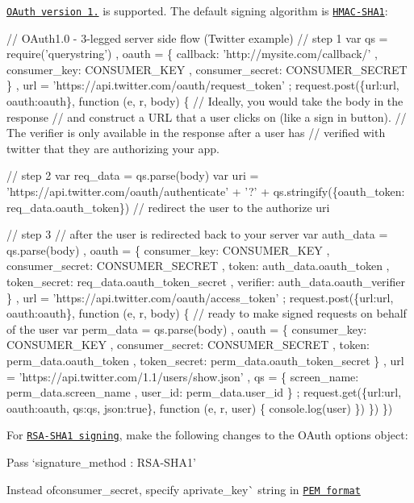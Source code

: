 \href{https://tools.ietf.org/html/rfc5849}{\tt O\+Auth version 1.} is supported. The default signing algorithm is \href{https://tools.ietf.org/html/rfc5849#section-3.4.2}{\tt H\+M\+A\+C-\/\+S\+H\+A1}\+:


\begin{DoxyCode}
// OAuth1.0 - 3-legged server side flow (Twitter example)
// step 1
var qs = require('querystring')
  , oauth =
    \{ callback: 'http://mysite.com/callback/'
    , consumer\_key: CONSUMER\_KEY
    , consumer\_secret: CONSUMER\_SECRET
    \}
  , url = 'https://api.twitter.com/oauth/request\_token'
  ;
request.post(\{url:url, oauth:oauth\}, function (e, r, body) \{
  // Ideally, you would take the body in the response
  // and construct a URL that a user clicks on (like a sign in button).
  // The verifier is only available in the response after a user has
  // verified with twitter that they are authorizing your app.

  // step 2
  var req\_data = qs.parse(body)
  var uri = 'https://api.twitter.com/oauth/authenticate'
    + '?' + qs.stringify(\{oauth\_token: req\_data.oauth\_token\})
  // redirect the user to the authorize uri

  // step 3
  // after the user is redirected back to your server
  var auth\_data = qs.parse(body)
    , oauth =
      \{ consumer\_key: CONSUMER\_KEY
      , consumer\_secret: CONSUMER\_SECRET
      , token: auth\_data.oauth\_token
      , token\_secret: req\_data.oauth\_token\_secret
      , verifier: auth\_data.oauth\_verifier
      \}
    , url = 'https://api.twitter.com/oauth/access\_token'
    ;
  request.post(\{url:url, oauth:oauth\}, function (e, r, body) \{
    // ready to make signed requests on behalf of the user
    var perm\_data = qs.parse(body)
      , oauth =
        \{ consumer\_key: CONSUMER\_KEY
        , consumer\_secret: CONSUMER\_SECRET
        , token: perm\_data.oauth\_token
        , token\_secret: perm\_data.oauth\_token\_secret
        \}
      , url = 'https://api.twitter.com/1.1/users/show.json'
      , qs =
        \{ screen\_name: perm\_data.screen\_name
        , user\_id: perm\_data.user\_id
        \}
      ;
    request.get(\{url:url, oauth:oauth, qs:qs, json:true\}, function (e, r, user) \{
      console.log(user)
    \})
  \})
\})
\end{DoxyCode}


For \href{https://tools.ietf.org/html/rfc5849#section-3.4.3}{\tt R\+S\+A-\/\+S\+H\+A1 signing}, make the following changes to the O\+Auth options object\+:
\begin{DoxyItemize}
\item Pass `signature\+\_\+method \+: \textquotesingle{}R\+S\+A-\/\+S\+H\+A1'{\ttfamily }
\item {\ttfamily Instead of}consumer\+\_\+secret{\ttfamily , specify a}private\+\_\+key\`{} string in \href{http://how2ssl.com/articles/working_with_pem_files/}{\tt P\+EM format}
\end{DoxyItemize}

